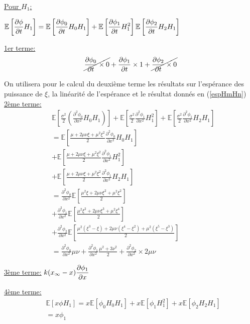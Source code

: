 \documentclass[a4paper,oneside,11pt]{article}
\newcommand{\ds}{\ensuremath{\displaystyle}}
\newcommand{\dr}{\ensuremath{\partial}}
\begin{document}
\underline{Pour $H_{1}$:}

$\ds{\mathbb{E}\left[\frac{\dr \phi }{\dr t}H_{1}\right]=\mathbb{E}\left[\frac{\dr\phi_{0}}{\dr t}H_{0}H_{1}\right]+\mathbb{E}\left[\frac{\dr\phi_{1}}{\dr t}H_{1}^{2}\right]\mathbb{E}\left[\frac{\dr\phi_{2}}{\dr t}H_{2}H_{1}\right]}$

\underline{1er terme:}
\begin{equation*}
\cancel{\frac{\dr \phi_{0}}{\dr t}\times0}+\frac{\dr \phi_{1}}{\dr t}\times1+\cancel{\frac{\dr \phi_{2}}{\dr t}\times0}
\end{equation*}

On utilisera pour le calcul du deuxième terme les résultats sur l'espérance des puissance de $\xi$, la linéarité de l'espérance et le résultat donnés en (\ref{espHmHn})\newline
\underline{2ème terme:}
\begin{align*}
&\mathbb{E}\left[\frac{\sigma^{2}}{2}(\frac{\dr^{2}\phi_{0}}{\dr x^{2}}H_{0}H_{1})\right]+\mathbb{E}\left[\frac{\sigma^{2}}{2}\frac{\dr^{2}\phi_{1}}{\dr x^{2}}H_{1}^2\right]+\mathbb{E}\left[\frac{\sigma^{2}}{2}\frac{\dr^{2}\phi_{1}}{\dr x^{2}}H_{2}H_{1}\right] \\
&=\mathbb{E}\left[\frac{\mu+2\mu\nu\xi+\mu^{2}\xi^{2}}{2}\frac{\dr^{2}\phi_{0}}{\dr x^{2}}H_{0}H_{1}\right] \\
&+\mathbb{E}\left[\frac{\mu+2\mu\nu\xi+\mu^{2}\xi^{2}}{2}\frac{\dr^{2}\phi_{1}}{\dr x^{2}}H_{1}^{2}\right] \\
&+\mathbb{E}\left[\frac{\mu+2\mu\nu\xi+\mu^{2}\xi^{2}}{2}\frac{\dr^{2}\phi_{1}}{\dr x^{2}}H_{2}H_{1}\right] \\
&=\frac{\dr^{2}\phi_{0}}{\dr x^{2}}\mathbb{E}\left[\frac{\mu^{2}\xi+2\mu\nu\xi^{2}+\mu^{2}\xi^{2}}{2}\right] \\
&+\frac{\dr^{2}\phi_{1}}{\dr x^{2}}\mathbb{E}\left[\frac{\mu^{2}\xi^{2}+2\mu\nu\xi^{3}+\mu^{2}\xi^{4}}{2}\right] \\
&+\frac{\dr^{2}\phi_{2}}{\dr x^{2}}\mathbb{E}\left[\frac{\mu^{2}(\xi^{3}-\xi)+2\mu\nu(\xi^{4}-\xi^{2})+\mu^{2}(\xi^{5}-\xi^{3})}{2}\right] \\
&=\frac{\dr^{2}\phi_{0}}{\dr x^{2}}\mu\nu+\frac{\dr^{2}\phi_{1}}{\dr x^{2}}\frac{\mu^{2}+3\nu^{2}}{2}+\frac{\dr^{2}\phi_{2}}{\dr x^{2}}\times 2 \mu \nu
\end{align*}

\underline{3ème terme:}
$\ds{k(x_{\infty}-x)\frac{\dr \phi_{1}}{\dr x}}\newline$

\underline{4ème terme:}
\begin{align*}
&\mathbb{E}\left[x\phi H_{1}\right]=x \mathbb{E}\left[\phi_{0}H_{0}H_{1}\right]+x \mathbb{E}\left[\phi_{1}H_{1}^{2}\right]+x \mathbb{E}\left[\phi_{2}H_{2}H_{1}\right] \\
&=x\phi_{1}
\end{align*}
\end{document}
